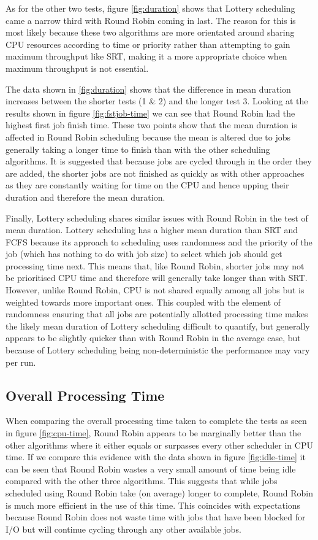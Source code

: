 \documentclass{acm_proc_article-sp}
\begin{document}
As for the other two tests, figure \ref{fig:duration} shows that Lottery scheduling came a narrow third with Round Robin coming in last. The reason for this is most likely because these two algorithms are more orientated around sharing CPU resources according to time or priority rather than attempting to gain maximum throughput like SRT, making it a more appropriate choice when maximum throughput is not essential.

The data shown in \ref{fig:duration} shows that the difference in mean duration increases between the shorter tests (1 \& 2) and the longer test 3. Looking at the results shown in figure \ref{fig:fstjob-time} we can see that Round Robin had the highest first job finish time. These two points show that the mean duration is affected in Round Robin scheduling because the mean is altered due to jobs generally taking a longer time to finish than with the other scheduling algorithms. It is suggested that because jobs are cycled through in the order they are added, the shorter jobs are not finished as quickly as with other approaches as they are constantly waiting for time on the CPU and hence upping their duration and therefore the mean duration.

Finally, Lottery scheduling shares similar issues with Round Robin in the test of mean duration. Lottery scheduling has a higher mean duration than SRT and FCFS because its approach to scheduling uses randomness and the priority of the job (which has nothing to do with job size) to select which job should get processing time next. This means that, like Round Robin, shorter jobs may not be prioritised CPU time and therefore will generally take longer than with SRT. However, unlike Round Robin, CPU is not shared equally among all jobs but is weighted towards more important ones. This coupled with the element of randomness ensuring that all jobs are potentially allotted processing time makes the likely mean duration of Lottery scheduling difficult to quantify, but generally appears to be slightly quicker than with Round Robin in the average case, but because of Lottery scheduling being non-deterministic the performance may vary per run.

\subsection{Overall Processing Time}
When comparing the overall processing time taken to complete the tests as seen in figure \ref{fig:cpu-time}, Round Robin appears to be marginally better than the other algorithms where it either equals or surpasses every other scheduler in CPU time. If we compare this evidence with the data shown in figure \ref{fig:idle-time} it can be seen that Round Robin wastes a very small amount of time being idle compared with the other three algorithms. This suggests that while jobs scheduled using Round Robin take (on average) longer to complete, Round Robin is much more efficient in the use of this time. This coincides with expectations because Round Robin does not waste time with jobs that have been blocked for I/O but will continue cycling through any other available jobs.
\end{document}
